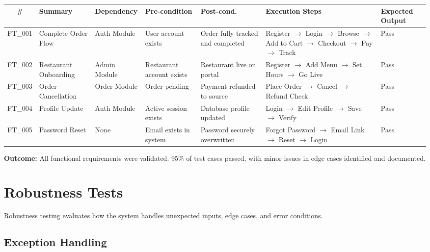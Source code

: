 \documentclass[12pt,a4paper]{report}
\begin{document}
\begin{longtable}{|c|p{1.8cm}|p{1.4cm}|p{1.8cm}|p{1.8cm}|p{2.2cm}|p{1.6cm}|}
\hline
\textbf{\#} & \textbf{Summary} & \textbf{Dependency} & \textbf{Pre-condition} & \textbf{Post-cond.} & \textbf{Execution Steps} & \textbf{Expected Output} \\
\hline
\endfirsthead
FT\_001 & Complete Order Flow & Auth Module & User account exists & Order fully tracked and completed & Register $\rightarrow$ Login $\rightarrow$ Browse $\rightarrow$ Add to Cart $\rightarrow$ Checkout $\rightarrow$ Pay $\rightarrow$ Track & Pass \\
\hline
FT\_002 & Restaurant Onboarding & Admin Module & Restaurant account exists & Restaurant live on portal & Register $\rightarrow$ Add Menu $\rightarrow$ Set Hours $\rightarrow$ Go Live & Pass \\
\hline
FT\_003 & Order Cancellation & Order Module & Order pending & Payment refunded to source & Place Order $\rightarrow$ Cancel $\rightarrow$ Refund Check & Pass \\
\hline
FT\_004 & Profile Update & Auth Module & Active session exists & Database profile updated & Login $\rightarrow$ Edit Profile $\rightarrow$ Save $\rightarrow$ Verify & Pass \\
\hline
FT\_005 & Password Reset & None & Email exists in system & Password securely overwritten & Forgot Password $\rightarrow$ Email Link $\rightarrow$ Reset $\rightarrow$ Login & Pass \\
\hline
\end{longtable}

\textbf{Outcome:} All functional requirements were validated. 95\% of test cases passed, with minor issues in edge cases identified and documented.

\section{Robustness Tests}
Robustness testing evaluates how the system handles unexpected inputs, edge cases, and error conditions.

\subsection{Exception Handling}
\end{document}
